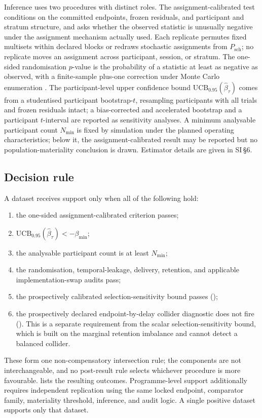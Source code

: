 \documentclass[11pt,a4paper]{article}
\theoremstyle{definition}
\newcommand{\UCB}{\mathrm{UCB}_{0.95}}
\begin{document}
Inference uses two procedures with distinct roles. The assignment-calibrated test
conditions on the committed endpoints, frozen residuals, and participant and
stratum structure, and asks whether the observed statistic is unusually negative
under the assignment mechanism actually used. Each replicate permutes fixed
multisets within declared blocks or redraws stochastic assignments from
\(P_{\mathrm{sch}}\); no replicate moves an assignment across participant,
session, or stratum. The one-sided randomisation \(p\)-value is the probability of
a statistic at least as negative as observed, with a finite-sample plus-one
correction under Monte Carlo enumeration \citep{Harris2023}. The
participant-level upper confidence bound \(\UCB(\widehat{\beta}_\tau)\) comes from
a studentised participant bootstrap-\(t\), resampling participants with all
trials and frozen residuals intact; a bias-corrected and accelerated bootstrap and
a participant \(t\)-interval are reported as sensitivity analyses. A minimum
analysable participant count \(N_{\min}\) is fixed by simulation under the planned
operating characteristics; below it, the assignment-calibrated result may be
reported but no population-materiality conclusion is drawn. Estimator details are
given in SI\,\S6.

\subsection{Decision rule}
\label{sec:decision}

A dataset receives support only when all of the following hold:
\begin{enumerate}[leftmargin=2.2em,itemsep=2pt]
\item the one-sided assignment-calibrated criterion passes;
\item \(\UCB(\widehat{\beta}_\tau)<-\beta_{\min}\);
\item the analysable participant count is at least \(N_{\min}\);
\item the randomisation, temporal-leakage, delivery, retention, and applicable
implementation-swap audits pass;
\item the prospectively calibrated selection-sensitivity bound passes
();
\item the prospectively declared endpoint-by-delay collider diagnostic does not
fire (). This is a separate requirement from the scalar
selection-sensitivity bound, which is built on the marginal retention imbalance
and cannot detect a balanced collider.
\end{enumerate}
These form one non-compensatory intersection rule; the components are not
interchangeable, and no post-result rule selects whichever procedure is more
favourable.  lists the resulting outcomes. Programme-level
support additionally requires independent replication using the same locked
endpoint, comparator family, materiality threshold, inference, and audit logic. A
single positive dataset supports only that dataset.
\end{document}
